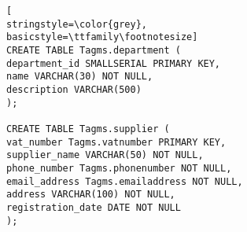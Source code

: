 \begin{lstlisting}[
stringstyle=\color{grey},
basicstyle=\ttfamily\footnotesize]
CREATE TABLE Tagms.department (
department_id SMALLSERIAL PRIMARY KEY,
name VARCHAR(30) NOT NULL,
description VARCHAR(500)
);

CREATE TABLE Tagms.supplier (
vat_number Tagms.vatnumber PRIMARY KEY,
supplier_name VARCHAR(50) NOT NULL,
phone_number Tagms.phonenumber NOT NULL,
email_address Tagms.emailaddress NOT NULL,
address VARCHAR(100) NOT NULL,
registration_date DATE NOT NULL
);

\end{lstlisting}